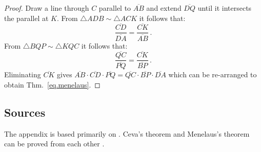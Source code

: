 \begin{proof}
Draw a line through $C$ parallel to $\overline{AB}$ and extend $\overline{DQ}$ until it intersects the parallel at $K$. From $\triangle ADB \sim \triangle ACK$ it follows that:
\begin{equation*}
\displaystyle\frac{\overline{CD}}{\overline{DA}}=\displaystyle\frac{\overline{CK}}{\overline{AB}}\,.
\end{equation*}
From $\triangle  BQP\sim \triangle KQC$ it follows that:
\begin{equation*}
\displaystyle\frac{\overline{QC}}{\overline{PQ}}=\displaystyle\frac{\overline{CK}}{\overline{BP}}\,.
\end{equation*}
Eliminating $\overline{CK}$ gives
$\overline{AB}\cdot\overline{CD}\cdot\overline{PQ}=\overline{QC}\cdot\overline{BP}\cdot\overline{DA}$ which can be re-arranged to obtain Thm.~\ref{eq.menelaus}.
\end{proof}


\subsection*{Sources}

The appendix is based primarily on \cite{gelfand}. Ceva's theorem and Menelaus's theorem can be proved from each other \cite{silvester}.
